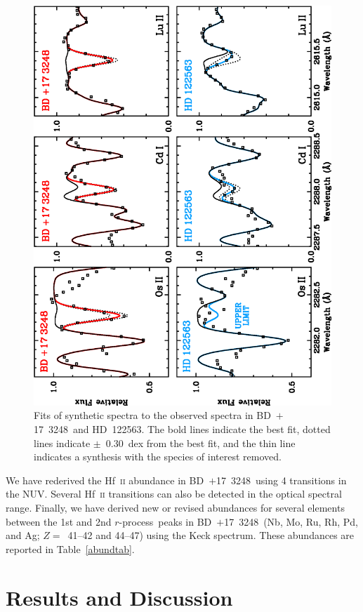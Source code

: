 \documentclass{emulateapj}
\def\bd{\mbox{BD~$+$17~3248}}
\def\hd{\mbox{HD~122563}}
\def\rpro{\mbox{$r$-process}}
\begin{document}
\begin{figure}
\begin{center}
\includegraphics[angle=270,width=4.5in]{f3.eps}
\end{center}
\caption{
\label{specplot}
Fits of synthetic spectra to the observed spectra in \bd\ and \hd.
The bold lines indicate the best fit, dotted lines indicate
$\pm$~0.30~dex from the best fit, and the thin line indicates
a synthesis with the species of interest removed.
}
\end{figure}

We have rederived the Hf~\textsc{ii} abundance in \bd\
using 4 transitions in the NUV.
Several Hf~\textsc{ii} transitions can also be detected in the 
optical spectral range. 
Finally, we have derived new or revised
abundances for several elements between the
1st and 2nd \rpro\ peaks in \bd\ (Nb, Mo, Ru, Rh, Pd, and Ag; 
$Z =$~41--42 and 44--47) using the Keck spectrum.
These abundances are reported in Table~\ref{abundtab}.


\section{Results and Discussion}
\label{results}
\end{document}
